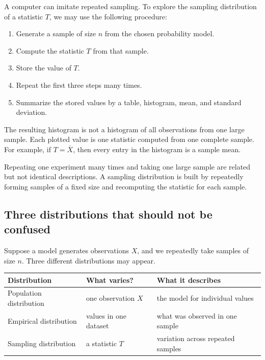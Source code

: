 A computer can imitate repeated sampling. To explore the sampling distribution
of a statistic \(T\), we may use the following procedure:

\begin{enumerate}
    \item Generate a sample of size \(n\) from the chosen probability model.
    \item Compute the statistic \(T\) from that sample.
    \item Store the value of \(T\).
    \item Repeat the first three steps many times.
    \item Summarize the stored values by a table, histogram, mean, and standard
    deviation.
\end{enumerate}

The resulting histogram is not a histogram of all observations from one large
sample. Each plotted value is one statistic computed from one complete sample.
For example, if \(T=\overline X\), then every entry in the histogram is a sample
mean.

\begin{remarkbox}
Repeating one experiment many times and taking one large sample are related but
not identical descriptions. A sampling distribution is built by repeatedly
forming samples of a fixed size and recomputing the statistic for each sample.
\end{remarkbox}

\subsection*{Three distributions that should not be confused}

Suppose a model generates observations \(X\), and we repeatedly take samples of
size \(n\). Three different distributions may appear.

\begin{center}
\begin{tabular}{lll}
\toprule
Distribution & What varies? & What it describes \\
\midrule
Population distribution & one observation \(X\) & the model for individual values \\
Empirical distribution & values in one dataset & what was observed in one sample \\
Sampling distribution & a statistic \(T\) & variation across repeated samples \\
\bottomrule
\end{tabular}
\end{center}

